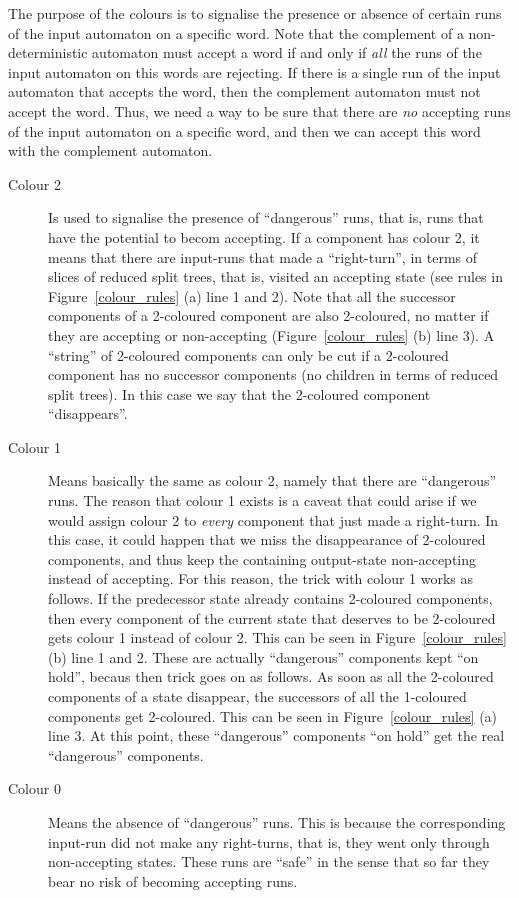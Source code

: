 The purpose of the colours is to signalise the presence or absence of certain runs of the input automaton on a specific word. Note that the complement of a non-deterministic automaton must accept a word if and only if \textit{all} the runs of the input automaton on this words are rejecting. If there is a single run of the input automaton that accepts the word, then the complement automaton must not accept the word. Thus, we need a way to be sure that there are \textit{no} accepting runs of the input automaton on a specific word, and then we can accept this word with the complement automaton. 

\begin{description}
\item[Colour 2]
Is used to signalise the presence of ``dangerous'' runs, that is, runs that have the potential to becom accepting. If a component has colour 2, it means that there are input-runs that made a ``right-turn'', in terms of slices of reduced split trees, that is, visited an accepting state (see rules in Figure~\ref{colour_rules} (a) line 1 and 2). Note that all the successor components of a 2-coloured component are also 2-coloured, no matter if they are accepting or non-accepting (Figure~\ref{colour_rules} (b) line 3). A ``string'' of 2-coloured components can only be cut if a 2-coloured component has no successor components (no children in terms of reduced split trees). In this case we say that the 2-coloured component ``disappears''.

\item[Colour 1]
Means basically the same as colour 2, namely that there are ``dangerous'' runs. The reason that colour 1 exists is a caveat that could arise if we would assign colour 2 to \textit{every} component that just made a right-turn. In this case, it could happen that we miss the disappearance of 2-coloured components, and thus keep the containing output-state non-accepting instead of accepting. For this reason, the trick with colour 1 works as follows. If the predecessor state already contains 2-coloured components, then every component of the current state that deserves to be 2-coloured gets colour 1 instead of colour 2. This can be seen in Figure~\ref{colour_rules} (b) line 1 and 2. These are actually ``dangerous'' components kept ``on hold'', becaus then trick goes on as follows. As soon as all the 2-coloured components of a state disappear, the successors of all the 1-coloured components get 2-coloured. This can be seen in Figure~\ref{colour_rules} (a) line 3. At this point, these ``dangerous'' components ``on hold'' get the real ``dangerous'' components.

\item[Colour 0]
Means the absence of ``dangerous'' runs. This is because the corresponding input-run did not make any right-turns, that is, they went only through non-accepting states. These runs are ``safe'' in the sense that so far they bear no risk of becoming accepting runs.
\end{description}


